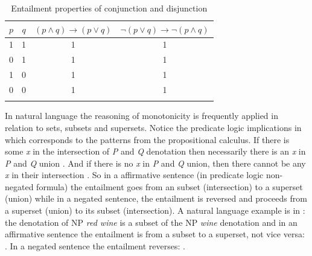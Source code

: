 \documentclass[output=paper,
]{langscibook}
\begin{document}
\ea \label{ex-10} 
\z
\z

\begin{table}
\begin{tabularx}{0.65\textwidth}{cccc}
\lsptoprule
$p$\strut & $q$\strut & $(p\wedge q)\rightarrow(p\vee q)$\strut & $\neg (p\vee q)\rightarrow\neg(p\wedge q)$\strut
\tabularnewline
\midrule
1\strut & 1\strut & 1\strut & 1\strut \tabularnewline
0\strut & 1\strut & 1\strut & 1\strut \tabularnewline
1\strut & 0\strut & 1\strut & 1\strut \tabularnewline
0\strut & 0\strut & 1\strut & 1\strut \tabularnewline
\lspbottomrule

\end{tabularx}
\caption{Entailment properties of conjunction and disjunction}
     \label{table1}
\end{table}



\noindent In natural language the reasoning of monotonicity is frequently applied in relation to sets, subsets and supersets. Notice the predicate logic implications in  which corresponds to the patterns from the propositional calculus. If there is some \textit{x} in the intersection of \textit{P} and \textit{Q} denotation then necessarily there is an \textit{x} in \textit{P} and \textit{Q} union . And if there is no \textit{x} in \textit{P} and \textit{Q} union, then there cannot be any \textit{x} in their intersection . So in a affirmative sentence (in predicate logic non-negated formula) the entailment goes from an subset (intersection) to a superset (union) while in a negated sentence, the entailment is reversed and proceeds from a superset (union) to its subset (intersection). A natural language example is in : the denotation of NP \textit{red wine} is a subset of the NP \textit{wine} denotation and in an affirmative sentence  the entailment is from a subset to a superset, not vice versa: . In a negated sentence the entailment reverses: .
\end{document}
